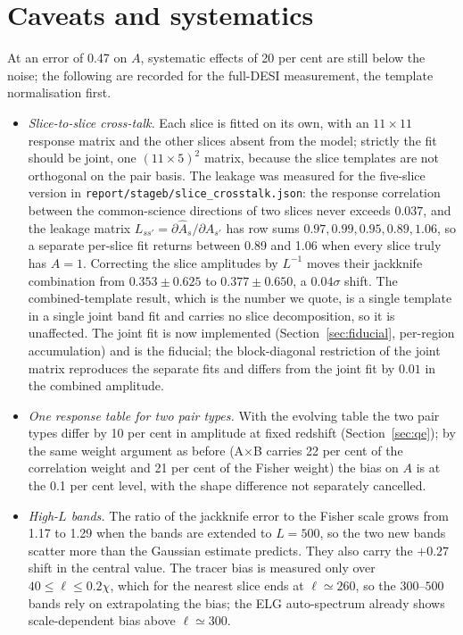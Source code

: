 \documentclass[11pt,a4paper]{article}
\begin{document}
\section{Caveats and systematics}
\label{sec:caveats}
At an error of 0.47 on $A$, systematic effects of 20 per cent are still below the noise; the following are recorded for the full-DESI measurement, the template normalisation first.
\begin{itemize}
\item \emph{Slice-to-slice cross-talk.} Each slice is fitted on its own, with an $11\times11$ response matrix and the other slices absent from the model; strictly the fit should be joint, one $(11\times5)^2$ matrix, because the slice templates are not orthogonal on the pair basis. The leakage was measured for the five-slice version in \texttt{report/stageb/slice\_crosstalk.json}: the response correlation between the common-science directions of two slices never exceeds $0.037$, and the leakage matrix $L_{ss'}=\partial\hat A_s/\partial A_{s'}$ has row sums $0.97,0.99,0.95,0.89,1.06$, so a separate per-slice fit returns between 0.89 and 1.06 when every slice truly has $A=1$. Correcting the slice amplitudes by $L^{-1}$ moves their jackknife combination from $0.353\pm0.625$ to $0.377\pm0.650$, a $0.04\sigma$ shift. The combined-template result, which is the number we quote, is a single template in a single joint band fit and carries no slice decomposition, so it is unaffected. The joint fit is now implemented (Section~\ref{sec:fiducial}, per-region accumulation) and is the fiducial; the block-diagonal restriction of the joint matrix reproduces the separate fits and differs from the joint fit by $0.01$ in the combined amplitude.
\item \emph{One response table for two pair types.} With the evolving table the two pair types differ by 10 per cent in amplitude at fixed redshift (Section~\ref{sec:qe}); by the same weight argument as before (A$\times$B carries 22 per cent of the correlation weight and 21 per cent of the Fisher weight) the bias on $A$ is at the 0.1 per cent level, with the shape difference not separately cancelled.
\item \emph{High-$L$ bands.} The ratio of the jackknife error to the Fisher scale grows from 1.17 to 1.29 when the bands are extended to $L=500$, so the two new bands scatter more than the Gaussian estimate predicts. They also carry the $+0.27$ shift in the central value. The tracer bias is measured only over $40\le\ell\le0.2\chi$, which for the nearest slice ends at $\ell\simeq260$, so the $300$--$500$ bands rely on extrapolating the bias; the ELG auto-spectrum already shows scale-dependent bias above $\ell\simeq300$.

\end{itemize}
\end{document}
